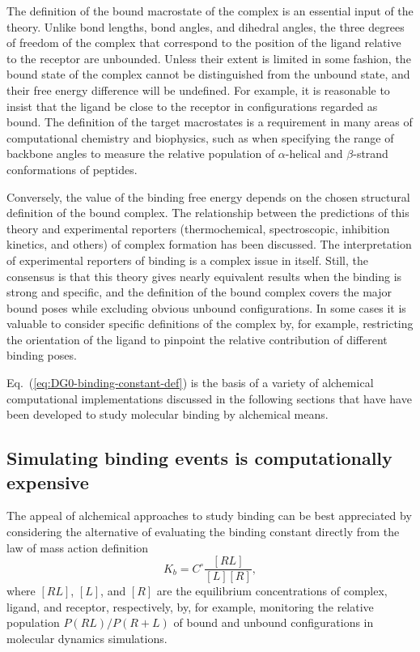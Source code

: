 \documentclass[9pt,bestpractices]{livecoms}
\begin{document}
The definition of the bound macrostate of the complex is an essential input of the theory. Unlike bond lengths, bond angles, and dihedral angles, the three degrees of freedom of the complex that correspond to the position of the ligand relative to the receptor are unbounded. Unless their extent is limited in some fashion, the bound state of the complex cannot be distinguished from the unbound state, and their free energy difference will be undefined. For example, it is reasonable to insist that the ligand be close to the receptor in configurations regarded as bound. The definition of the target macrostates is a requirement in many areas of computational chemistry and biophysics, such as when specifying the range of backbone angles to measure the relative population of $\alpha$-helical and $\beta$-strand conformations of peptides.  

Conversely, the value of the binding free energy depends on the chosen structural definition of the bound complex. The relationship between the predictions of this theory and experimental reporters (thermochemical, spectroscopic, inhibition kinetics, and others) of complex formation has been discussed.\cite{gilson1997statisticalthermodynamic,mihailescu2004theory,gallicchio2011recentadv,simonson2016physical,gallicchio2021comppeptsci} The interpretation of experimental reporters of binding is a complex issue in itself. Still, the consensus is that this theory gives nearly equivalent results when the binding is strong and specific, and the definition of the bound complex covers the major bound poses while excluding obvious unbound configurations. In some cases it is valuable to consider specific definitions of the complex by, for example, restricting the orientation of the ligand to pinpoint the relative contribution of different binding poses.

Eq.~(\ref{eq:DG0-binding-constant-def}) is the basis of a variety of alchemical computational implementations discussed in the following sections that have have been developed to study molecular binding by alchemical means.

\subsection{Simulating binding events is computationally expensive}

The appeal of alchemical approaches to study binding can be best appreciated by considering the alternative of evaluating the binding constant directly from the law of mass action definition
\begin{equation}\label{eq:law-mass-action}
 K_b = C^{\circ}\frac{[RL]}{[L][R]},
\end{equation}
where $[RL]$, $[L]$, and $[R]$ are the equilibrium concentrations of complex, ligand, and receptor, respectively, by, for example, monitoring the relative population $P(RL)/P(R+L)$ of bound and unbound configurations in molecular dynamics simulations.~\cite{jong2011determining,pan2017quantitative}
\end{document}
